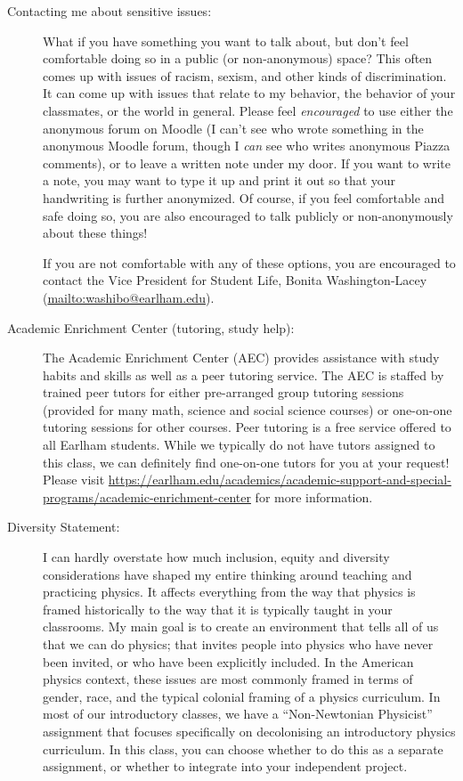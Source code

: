 \documentclass[12pt]{article}
\begin{document}
{\begin{description}
  \item[Contacting me about sensitive issues:] What if you have
        something you want to talk about, but don't feel comfortable
        doing so in a public (or non-anonymous) space? This often
        comes up with issues of racism, sexism, and other kinds of
        discrimination. It can come up with issues that relate to my
        behavior, the behavior of your classmates, or the world in
        general. Please feel {\it encouraged} to use either the
        anonymous forum on Moodle (I can't see who wrote something in
        the anonymous Moodle forum, though I {\it can} see who writes
        anonymous Piazza comments), or to leave a written note under
        my door. If you want to write a note, you may want to type it
        up and print it out so that your handwriting is further
        anonymized. Of course, if you feel comfortable and safe doing
        so, you are also encouraged to talk publicly or
        non-anonymously about these things! 

        If you are not comfortable with any of these options, you are
        encouraged to contact the Vice President for Student Life,
        Bonita Washington-Lacey (\url{mailto:washibo@earlham.edu}).

  \item[Academic Enrichment Center (tutoring, study help):] The
        Academic Enrichment Center (AEC) provides assistance with
        study habits and skills as well as a peer tutoring
        service. The AEC is staffed by trained peer tutors for either
        pre-arranged group tutoring sessions (provided for many math,
        science and social science courses) or one-on-one tutoring
        sessions for other courses. Peer tutoring is a free service
        offered to all Earlham students. While we typically do not
        have tutors assigned to this class, we can definitely find
        one-on-one tutors for you at your request! Please visit
        \url{https://earlham.edu/academics/academic-support-and-special-programs/academic-enrichment-center} 
        for more information.

  \item[Diversity Statement:] I can hardly overstate how much inclusion,
        equity and diversity considerations have shaped my entire thinking
        around teaching and practicing physics. It affects everything from the
        way that physics is framed historically to the way that it is
        typically taught in your classrooms. My main goal is to create an
        environment that tells all of us that we can do physics; that invites
        people into physics who have never been invited, or who have been
        explicitly included. In the American physics context, these issues are
        most commonly framed in terms of gender, race, and the typical
        colonial framing of a physics curriculum. In most of our
        introductory classes, we have a ``Non-Newtonian Physicist''
        assignment that focuses specifically on decolonising an
        introductory physics curriculum. In this class, you can choose
        whether to do this as a separate assignment, or whether to
        integrate into your independent project.


\end{description}}
\end{document}
